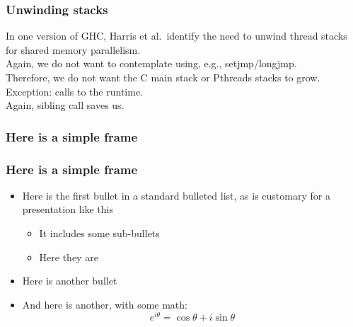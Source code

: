 \documentclass{beamer}
\begin{document}
\begin{frame}
\frametitle{Unwinding stacks}
In one version of GHC, Harris et al.\ identify the need to unwind thread stacks for shared
memory parallelism.
\\\vspace{0.1in}
Again, we do not want to contemplate using, e.g., setjmp/longjmp.
\\\vspace{0.1in}
Therefore, we do not want the C main stack or Pthreads stacks to grow.
\\\vspace{0.1in}
Exception:  calls to the runtime.
\\\vspace{0.1in}
Again, sibling call saves us.
\end{frame}


\begin{frame}
\frametitle{Here is a simple frame}
\end{frame}


\begin{frame}
\frametitle{Here is a simple frame}
    \begin{itemize}
        \item Here is the first bullet in a standard bulleted list,
            as is customary for a presentation like this
        \begin{itemize}
            \item It includes some sub-bullets
            \item Here they are
        \end{itemize}
        \item Here is another bullet
        \item And here is another, with some math:
            \[ e^{i\theta} = \cos \theta + i \sin \theta \]
    \end{itemize}
\end{frame}
\end{document}
